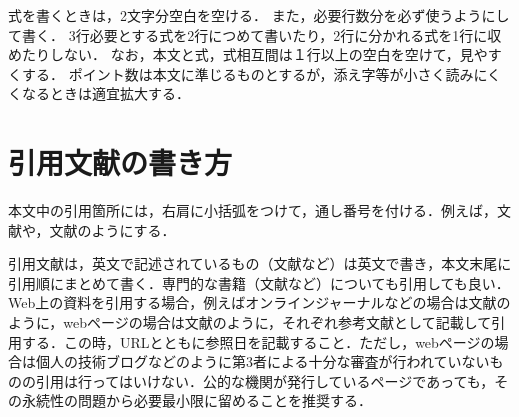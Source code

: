 \documentclass[10pt]{jarticle}
\begin{document}
    
    式を書くときは，2文字分空白を空ける．
    また，必要行数分を必ず使うようにして書く．
    3行必要とする式を2行につめて書いたり，2行に分かれる式を1行に収めたりしない．
    なお，本文と式，式相互間は１行以上の空白を空けて，見やすくする．
    ポイント数は本文に準じるものとするが，添え字等が小さく読みにくくなるときは適宜拡大する．
    
    
    \section{引用文献の書き方}%
    本文中の引用箇所には，右肩に小括弧をつけて，通し番号を付ける．例えば，文献\cite{工大2005}や，文献\cite{Shibutani2004, Handbook1979, Kikuchi2017, Adrobo2019}のようにする．
    
    引用文献は，英文で記述されているもの（文献\cite{Shibutani2004}など）は英文で書き，本文末尾に引用順にまとめて書く．専門的な書籍（文献\cite{Handbook1979}など）についても引用しても良い．
    Web上の資料を引用する場合，例えばオンラインジャーナルなどの場合は文献\cite{Kikuchi2017}のように，webページの場合は文献\cite{Adrobo2019}のように，それぞれ参考文献として記載して引用する．この時，URLとともに参照日を記載すること．ただし，webページの場合は個人の技術ブログなどのように第3者による十分な審査が行われていないものの引用は行ってはいけない．公的な機関が発行しているページであっても，その永続性の問題から必要最小限に留めることを推奨する．
        
\end{document}
